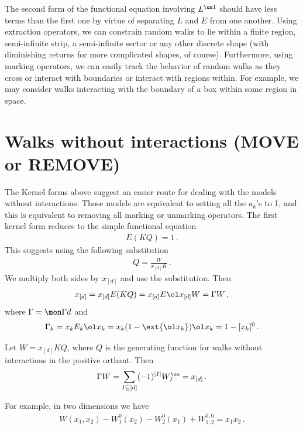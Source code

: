 The second form of the functional equation involving $L^{\um 1}$ should have less terms than the first one by virtue of separating $L$ and $E$ from one another. Using extraction operators, we can constrain random walks to lie within a finite region, semi-infinite strip, a semi-infinite sector or any other discrete shape (with diminishing returns for more complicated shapes, of course). Furthermore, using marking operators, we can easily track the behavior of random walks as they cross or interact with boundaries or interact with regions within. For example, we may consider walks interacting with the boundary of a box within some region in space. 

\section{Walks without interactions (MOVE or REMOVE)}
The Kernel forms above suggest an easier route for dealing with the models without interactions. Those models are equivalent to setting all the $a_k$'s to 1, and this is equivalent to removing all marking or unmarking operators. The first kernel form reduces to the simple functional equation
\begin{align}
	 E(KQ) = 1\,.
\end{align}
This suggests using the following substitution
\begin{align}
	Q = \frac{W}{x_{[d]} K}\,.
\end{align}
We multiply both sides by $x_{[d]}$ and use the substitution. Then
\begin{align}
	x_{[d]} = x_{[d]}E(KQ) = x_{[d]}E\ol x_{[d]}W = \Gamma W\,,
\end{align}
where  $\Gamma = \mon \Gamma d$ and 
\begin{align}
	\Gamma_k = x_kE_k\ol x_k = x_k(1-\ext{\ol x_k})\ol x_k = 1 - [x_k]^0\,.
\end{align}
\begin{prop} Let $W = x_{[d]}KQ$, where $Q$ is the generating function for walks without interactions in the positive orthant. Then
\begin{align}
	\Gamma W = \sum_{I\subseteq [d]}(-1)^{|I|} W_I^\oo= x_{[d]}\,.
\end{align}
\end{prop}
For example, in two dimensions we have
\begin{align}
	W(x_1,x_2) - W_1^0(x_2) -W_2^0(x_1) + W_{1,2}^{0,0} = x_1x_2\,.
\end{align}
